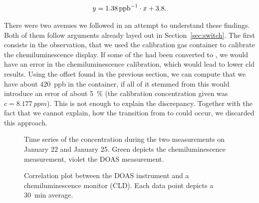 \begin{align*}
  y = \SI{1.38}{{ppb}\tothe{-1}} \cdot x + 3.8.
\end{align*}

There were two avenues we followed in an attempt to understand these
findings. Both of them follow arguments already layed out in
Section~\ref{sec:switch}. The first consists in the observation, that
we used the  calibration gas container to calibrate the
chemiluminescence display. If some of the  had been converted
to , we would have an error in the chemiluminescence
calibration, which would lead to lower cld results. Using the 
offset found in the previous section, we can compute that we have
about \SI{420}{ppb}  in the container, if all of it stemmed
from  this would introduce an error of about \SI{5}{\percent}
(the calibration concentration given was $c = \SI{8.177}{ppm}$). This
is not enough to explain the discrepancy. Together with the fact that
we cannot explain, how the transition from  to  could
occur, we discarded this approach.

\begin{figure}[htbp]
  \centering
  
  \hfill
  
  \caption{Time series of the  concentration during the two
    measurements on January 22 and January 25. Green depicts the
    chemiluminescence measurement, violet the DOAS measurement.}
  \label{fig:corr-ts}
\end{figure}
\begin{figure}[H]
  \centering
  
  \caption{Correlation plot between the DOAS instrument and a
    chemiluminescence monitor (CLD). Each data point depicts a
    \SI{30}{\minute} average.}
  \label{fig:cld-corr}
\end{figure}

